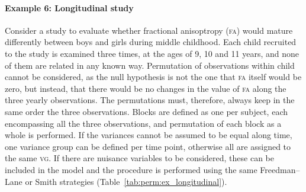 \paragraph{Example 6: Longitudinal study} Consider a study to evaluate whether fractional anisoptropy (\textsc{fa}) would mature differently between boys and girls during middle childhood. Each child recruited to the study is examined three times, at the ages of 9, 10 and 11 years, and none of them are related in any known way. Permutation of observations within child cannot be considered, as the null hypothesis is not the one that \textsc{fa} itself would be zero, but instead, that there would be no changes in the value of \textsc{fa} along the three yearly observations. The permutations must, therefore, always keep in the same order the three observations. Blocks are defined as one per subject, each encompassing all the three observations, and permutation of each block as a whole is performed. If the variances cannot be assumed to be equal along time, one variance group can be defined per time point, otherwise all are assigned to the same \textsc{vg}. If there are nuisance variables to be considered, these can be included in the model and the procedure is performed using the same Freedman--Lane or Smith strategies (Table~\ref{tab:perm:ex_longitudinal}).

